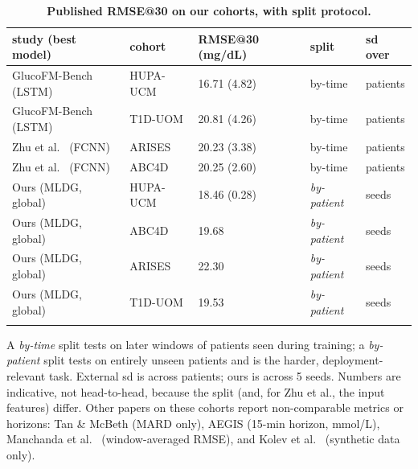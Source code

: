 \documentclass[10pt,letterpaper]{article}
\newlength\savedwidth
\newcommand\thickhline{\noalign{\global\savedwidth\arrayrulewidth\global\arrayrulewidth 2pt}%
\hline
\noalign{\global\arrayrulewidth\savedwidth}}
\begin{document}
\begin{table}[!ht]
\centering
\captionsetup{justification=centering,singlelinecheck=on}
\caption{\bf Published RMSE@30 on our cohorts, with split protocol.}
\label{tab:prior}
\begin{tabular}{lllll}
\thickhline
study (best model) & cohort & RMSE@30 (mg/dL) & split & sd over \\
\hline
GlucoFM-Bench \cite{lu2026glucofmbench} (LSTM) & HUPA-UCM & 16.71 (4.82) & by-time & patients \\
GlucoFM-Bench \cite{lu2026glucofmbench} (LSTM) & T1D-UOM  & 20.81 (4.26) & by-time & patients \\
Zhu et al.\ \cite{zhu2023fcnn} (FCNN)          & ARISES   & 20.23 (3.38) & by-time & patients \\
Zhu et al.\ \cite{zhu2023fcnn} (FCNN)          & ABC4D    & 20.25 (2.60) & by-time & patients \\
\hline
Ours (MLDG, global)            & HUPA-UCM & 18.46 (0.28) & \emph{by-patient} & seeds \\
Ours (MLDG, global)            & ABC4D    & 19.68 & \emph{by-patient} & seeds \\
Ours (MLDG, global)            & ARISES   & 22.30 & \emph{by-patient} & seeds \\
Ours (MLDG, global)            & T1D-UOM  & 19.53 & \emph{by-patient} & seeds \\
\thickhline
\end{tabular}
\begin{center}
{\small A \emph{by-time} split tests on later windows of patients seen during
training; a \emph{by-patient} split tests on entirely unseen patients and is the
harder, deployment-relevant task. External sd is across patients; ours is across
5 seeds. Numbers are indicative, not head-to-head, because the split (and, for
Zhu et al., the input features) differ. Other papers on these cohorts report
non-comparable metrics or horizons: Tan \& McBeth \cite{tan2026uncertainty}
(MARD only), AEGIS \cite{pansheriya2026aegis} (15-min horizon, mmol/L),
Manchanda et al.\ \cite{manchanda2025lstm} (window-averaged RMSE), and Kolev
et al.\ \cite{kolev2026benchmark} (synthetic data only).}
\end{center}
\end{table}
\end{document}
